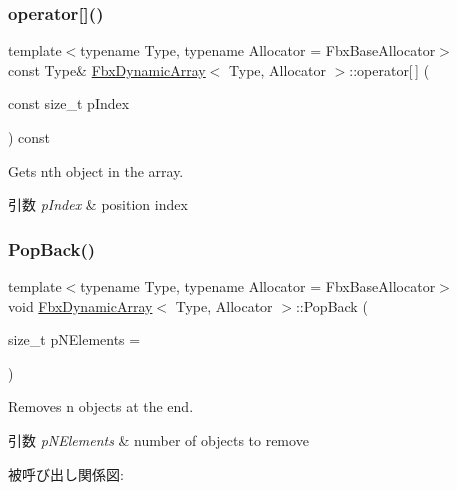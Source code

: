 \subsubsection{\texorpdfstring{operator[]()}{operator[]()}\hspace{0.1cm}{\footnotesize\ttfamily [2/2]}}
{\footnotesize\ttfamily template$<$typename Type, typename Allocator = Fbx\+Base\+Allocator$>$ \\
const Type\& \hyperlink{class_fbx_dynamic_array}{Fbx\+Dynamic\+Array}$<$ Type, Allocator $>$\+::operator\mbox{[}$\,$\mbox{]} (\begin{DoxyParamCaption}\item[{const size\+\_\+t}]{p\+Index }\end{DoxyParamCaption}) const}

Gets nth object in the array. 
\begin{DoxyParams}{引数}
{\em p\+Index} & position index \\
\hline
\end{DoxyParams}
\mbox{\label{class_fbx_dynamic_array_a0b59c646b7ffdbffe1af2e3947426f28}} 
\subsubsection{\texorpdfstring{Pop\+Back()}{PopBack()}}
{\footnotesize\ttfamily template$<$typename Type, typename Allocator = Fbx\+Base\+Allocator$>$ \\
void \hyperlink{class_fbx_dynamic_array}{Fbx\+Dynamic\+Array}$<$ Type, Allocator $>$\+::Pop\+Back (\begin{DoxyParamCaption}\item[{size\+\_\+t}]{p\+N\+Elements = {} }\end{DoxyParamCaption})}

Removes n objects at the end. 
\begin{DoxyParams}{引数}
{\em p\+N\+Elements} & number of objects to remove \\
\hline
\end{DoxyParams}
被呼び出し関係図\+:
\mbox{\label{class_fbx_dynamic_array_a50d7516815f9a6ad04a26beb66341dd6}} 
